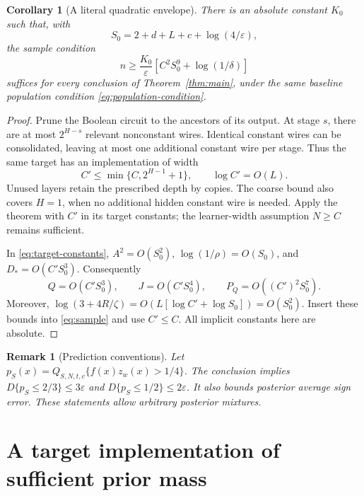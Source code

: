\documentclass[11pt]{article}
\newtheorem{corollary}[theorem]{Corollary}
\newtheorem{remark}[theorem]{Remark}
\begin{document}
\begin{corollary}[A literal quadratic envelope]\label{cor:literal}
There is an absolute constant $K_0$ such that, with
\[
 S_0=2+d+L+c+\log(4/\varepsilon),
\]
the sample condition
\[
 n\ge\frac{K_0}{\varepsilon}
       \left[C^2S_0^9+\log(1/\delta)\right]
\]
suffices for every conclusion of Theorem~\ref{thm:main}, under the same
baseline population condition \eqref{eq:population-condition}.
\end{corollary}
\begin{proof}
Prune the Boolean circuit to the ancestors of its output. At stage $s$,
there are at most $2^{H-s}$ relevant nonconstant wires. Identical constant
wires can be consolidated, leaving at most one additional constant wire
per stage. Thus the same target has an implementation of width
\[
 C'\le\min\{C,2^{H-1}+1\},\qquad \log C'=O(L).
\]
Unused layers retain the prescribed depth by copies. The coarse bound
also covers $H=1$, when no additional hidden constant wire is needed.
Apply the theorem with $C'$ in its target constants; the learner-width
assumption $N\ge C$ remains sufficient.

In \eqref{eq:target-constants}, $A^2=O(S_0^2)$,
$\log(1/\rho)=O(S_0)$, and
$D_*=O(C'S_0^3)$. Consequently
\[
 Q=O(C'S_0^3),\qquad J=O(C'S_0^4),\qquad
 P_Q=O((C')^2S_0^7).
\]
Moreover,
$\log(3+4R/\zeta)=O(L[\log C'+\log S_0])=O(S_0^2)$.
Insert these bounds into \eqref{eq:sample} and use $C'\le C$.
All implicit constants here are absolute.
\end{proof}

\begin{remark}[Prediction conventions]
Let $p_S(x)=Q_{S,N,t,c}\{f(x)z_w(x)>1/4\}$. The conclusion implies
$D\{p_S\le2/3\}\le3\varepsilon$ and
$D\{p_S\le1/2\}\le2\varepsilon$. It also bounds posterior average sign
error. These statements allow arbitrary posterior mixtures.
\end{remark}

\section{A target implementation of sufficient prior mass}
\end{document}
